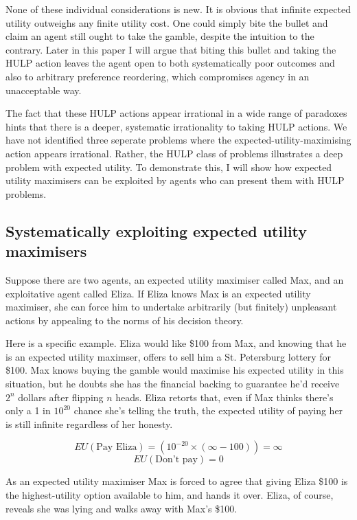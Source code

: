 \documentclass{article}
\begin{document}
None of these individual considerations is new. It is obvious that infinite expected utility outweighs any finite utility cost. One could simply bite the bullet and claim an agent still ought to take the gamble, despite the intuition to the contrary. Later in this paper I will argue that biting this bullet and taking the HULP action leaves the agent open to both systematically poor outcomes and also to arbitrary preference reordering, which compromises agency in an unacceptable way.

The fact that these HULP actions appear irrational in a wide range of paradoxes hints that there is a deeper, systematic irrationality to taking HULP actions. We have not identified three seperate problems where the expected-utility-maximising action appears irrational. Rather, the HULP class of problems illustrates a deep problem with expected utility. To demonstrate this, I will show how expected utility maximisers can be exploited by agents who can present them with HULP problems.

\subsection{Systematically exploiting expected utility maximisers}

Suppose there are two agents, an expected utility maximiser called Max, and an exploitative agent called Eliza. If Eliza knows Max is an expected utility maximiser, she can force him to undertake arbitrarily (but finitely) unpleasant actions by appealing to the norms of his decision theory. 

Here is a specific example. Eliza would like \$100 from Max, and knowing that he is an expected utility maximser, offers to sell him a St. Petersburg lottery for \$100. Max knows buying the gamble would maximise his expected utility in this situation, but he doubts she has the financial backing to guarantee he'd receive \(2^n\) dollars after flipping \(n\) heads. Eliza retorts that, even if Max thinks there's only a 1 in \(10^{20}\) chance she's telling the truth, the expected utility of paying her is still infinite regardless of her honesty.

\[EU(\mbox{Pay Eliza})=(10^{-20}\times(\infty-100)) = \infty\]
\[EU(\mbox{Don't pay})=0\]

As an expected utility maximiser Max is forced to agree that giving Eliza \$100 is the highest-utility option available to him, and hands it over. Eliza, of course, reveals she was lying and walks away with Max's \$100.
\end{document}
